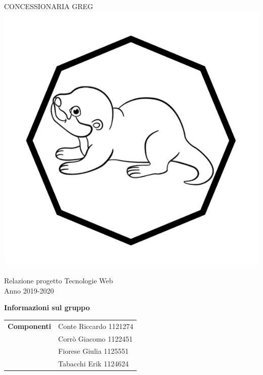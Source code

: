 \begin{center}
	\huge{CONCESSIONARIA GREG}\\
	\vspace{15pt}
	\includegraphics{./img/logo.png}
\end{center}

\vspace{1.5cm}

\begin{center}
	\huge{Relazione progetto Tecnologie Web}\\[0.2cm]
	\Large{Anno 2019-2020}
\end{center}

\vspace{5pt}

\begin{center}
	\textbf{\Large{Informazioni sul gruppo}}
\begin{table}[H]
	\hspace{3.5cm}
	\renewcommand{\arraystretch}{1.4}
	\begin{tabular}{l | l}
		\textbf{Componenti} & Conte Riccardo 1121274\\
		& Corrò Giacomo 1122451\\
		& Fiorese Giulia 1125551\\
		& Tabacchi Erik 1124624\\
	\end{tabular}
\end{table}
\end{center}

